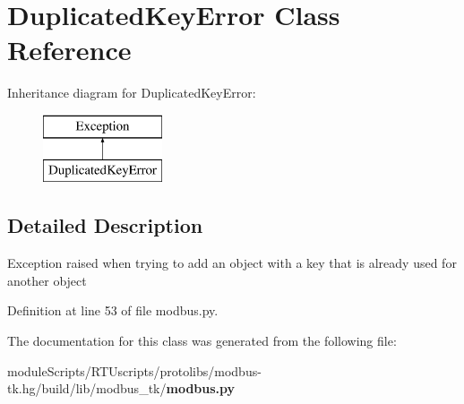 \section{Duplicated\+Key\+Error Class Reference}
\label{classmodbus__tk_1_1modbus_1_1_duplicated_key_error}
Inheritance diagram for Duplicated\+Key\+Error\+:\begin{figure}[H]
\begin{center}
\leavevmode
\includegraphics[height=2.000000cm]{classmodbus__tk_1_1modbus_1_1_duplicated_key_error}
\end{center}
\end{figure}


\subsection{Detailed Description}
\begin{DoxyVerb}Exception raised when trying to add an object with a key that is already 
used for another object
\end{DoxyVerb}
 

Definition at line 53 of file modbus.\+py.



The documentation for this class was generated from the following file\+:\begin{DoxyCompactItemize}
\item 
module\+Scripts/\+R\+T\+Uscripts/protolibs/modbus-\/tk.\+hg/build/lib/modbus\+\_\+tk/{\bf modbus.\+py}\end{DoxyCompactItemize}
